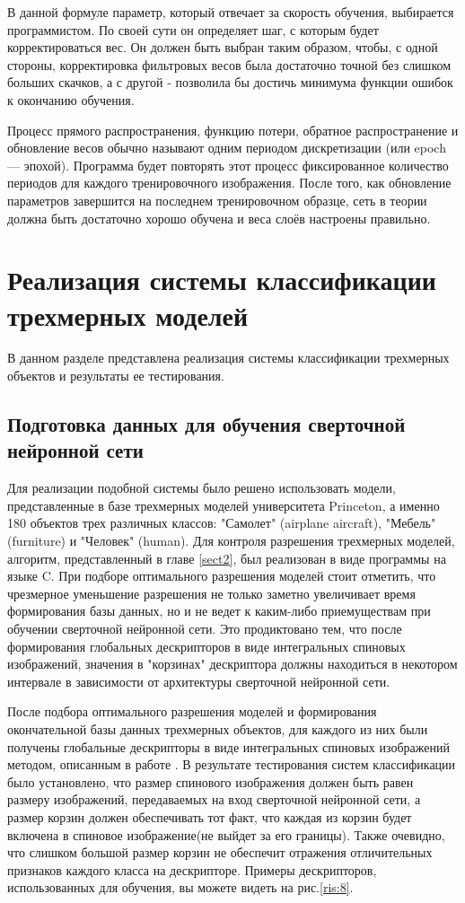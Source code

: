 \documentclass[14pt]{article}
\numberwithin{figure}{section}
\numberwithin{equation}{section}
\begin{document}
В данной формуле параметр, который отвечает за скорость обучения, выбирается программистом. По своей сути он определяет шаг, с которым будет корректироваться вес. Он должен быть выбран таким образом, чтобы, с одной стороны, корректировка фильтровых весов была достаточно точной без слишком больших скачков, а с другой - позволила бы достичь минимума функции ошибок к окончанию обучения.

Процесс прямого распространения, функцию потери, обратное распространение и обновление весов обычно называют одним периодом дискретизации (или epoch — эпохой). Программа будет повторять этот процесс фиксированное количество периодов для каждого тренировочного изображения. После того, как обновление параметров завершится на последнем тренировочном образце, сеть в теории должна быть достаточно хорошо обучена и веса слоёв настроены правильно.

\newpage

\section{Реализация системы классификации трехмерных моделей}

В данном разделе представлена реализация системы классификации трехмерных объектов и результаты ее тестирования.

\subsection{Подготовка данных для обучения сверточной нейронной сети}

Для реализации подобной системы было решено использовать модели, представленные в базе трехмерных моделей университета Princeton, а именно 180 объектов трех различных классов: "Самолет" (airplane aircraft), "Мебель" (furniture) и "Человек" (human). Для контроля разрешения трехмерных моделей, алгоритм, представленный в главе \ref{sect2}, был реализован в виде программы на языке C. При подборе оптимального разрешения моделей стоит отметить, что чрезмерное уменьшение разрешения не только заметно увеличивает время формирования базы данных, но и не ведет к каким-либо приемуществам при обучении сверточной нейронной сети. Это продиктовано тем, что после формирования глобальных дескрипторов в виде интегральных спиновых изображений, значения в "корзинах" дескриптора должны находиться в некотором интервале в зависимости от архитектуры сверточной нейронной сети.

 После подбора оптимального разрешения моделей и формирования окончательной базы данных трехмерных объектов, для каждого из них были получены глобальные дескрипторы в виде интегральных спиновых изображений методом, описанным в работе \cite{Chernikoff}. В результате тестирования систем классификации было установлено, что размер спинового изображения должен быть равен размеру изображений, передаваемых на вход сверточной нейронной сети, а размер корзин должен обеспечивать тот факт, что каждая из корзин будет включена в спиновое изображение(не выйдет за его границы). Также очевидно, что слишком большой размер корзин не обеспечит отражения отличительных признаков каждого класса на дескрипторе. Примеры дескрипторов, использованных для обучения, вы можете видеть на рис.\ref{ris:8}.
\end{document}
